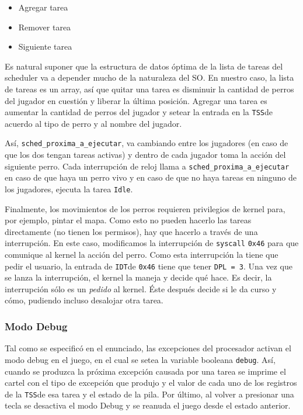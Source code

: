 \documentclass[twocolumn,10pt]{article}
\newcommand{\IDT}{\texttt{IDT}}
\newcommand{\TSS}{\texttt{TSS}}
\begin{document}
\begin{itemize}
\item Agregar tarea
\item Remover tarea
\item Siguiente tarea
\end{itemize}

Es natural suponer que la estructura de datos óptima de la lista de
tareas del scheduler va a depender mucho de la naturaleza del SO. En
nuestro caso, la lista de tareas es un array, así que quitar una tarea
es disminuir la cantidad de perros del jugador en cuestión y liberar
la última posición. Agregar una tarea es aumentar la cantidad de
perros del jugador y setear la entrada en la \TSS de acuerdo al tipo
de perro y al nombre del jugador.

Así, \texttt{sched\_proxima\_a\_ejecutar}, va cambiando entre los
jugadores (en caso de que los dos tengan tareas activas) y dentro de
cada jugador toma la acción del siguiente perro.  Cada interrupción de
reloj llama a \texttt{sched\_proxima\_a\_ejecutar} en caso de que haya
un perro vivo y en caso de que no haya tareas en ninguno de los
jugadores, ejecuta la tarea \texttt{Idle}.

Finalmente, los movimientos de los perros requieren privilegios de
kernel para, por ejemplo, pintar el mapa. Como esto no pueden hacerlo
las tareas directamente (no tienen los permisos), hay que hacerlo a
través de una interrupción. En este caso, modificamos la interrupción
de \texttt{syscall} \texttt{0x46} para que comunique al kernel la
acción del perro. Como esta interrupción la tiene que pedir el
usuario, la entrada de \IDT de \texttt{0x46} tiene que tener
\texttt{DPL = 3}. Una vez que se lanza la interrupción, el kernel la
maneja y decide qué hace. Es decir, la interrupción sólo es un
\emph{pedido} al kernel. Éste después decide si le da curso y cómo,
pudiendo incluso desalojar otra tarea.

\subsubsection{Modo Debug}

Tal como se especificó en el enunciado, las excepciones del procesador
activan el modo debug en el juego, en el cual se setea la variable
booleana \texttt{debug}. Así, cuando se produzca la próxima excepción
causada por una tarea se imprime el cartel con el tipo de excepción
que produjo y el valor de cada uno de los registros de la \TSS de esa
tarea y el estado de la pila. Por último, al volver a presionar una
tecla se desactiva el modo Debug y se reanuda el juego desde el estado
anterior.

\newpage
\end{document}
